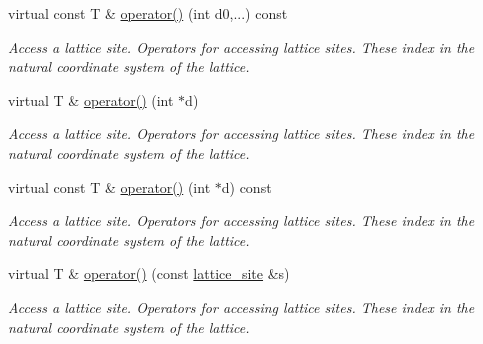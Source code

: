\begin{DoxyCompactItemize}
\mbox{\label{classsisl_1_1body__centered__cubic_af48bfe2b5475860672a421efc7fd0f41}} 
virtual const T \& \hyperlink{classsisl_1_1body__centered__cubic_af48bfe2b5475860672a421efc7fd0f41}{operator()} (int d0,...) const
\begin{DoxyCompactList}\small\item\em Access a lattice site. Operators for accessing lattice sites. These index in the natural coordinate system of the lattice. \end{DoxyCompactList}\item 
\mbox{\label{classsisl_1_1body__centered__cubic_a2390a32744243127b2be774fd99871f3}} 
virtual T \& \hyperlink{classsisl_1_1body__centered__cubic_a2390a32744243127b2be774fd99871f3}{operator()} (int $\ast$d)
\begin{DoxyCompactList}\small\item\em Access a lattice site. Operators for accessing lattice sites. These index in the natural coordinate system of the lattice. \end{DoxyCompactList}\item 
\mbox{\label{classsisl_1_1body__centered__cubic_a7cbc3858d97fe98a25a0570323169aa4}} 
virtual const T \& \hyperlink{classsisl_1_1body__centered__cubic_a7cbc3858d97fe98a25a0570323169aa4}{operator()} (int $\ast$d) const
\begin{DoxyCompactList}\small\item\em Access a lattice site. Operators for accessing lattice sites. These index in the natural coordinate system of the lattice. \end{DoxyCompactList}\item 
\mbox{\label{classsisl_1_1body__centered__cubic_aa8aae2c66e2cf075a419bb8232fbd43b}} 
virtual T \& \hyperlink{classsisl_1_1body__centered__cubic_aa8aae2c66e2cf075a419bb8232fbd43b}{operator()} (const \hyperlink{namespacesisl_acd18feee4026583db6185df2b25434aa}{lattice\+\_\+site} \&s)
\begin{DoxyCompactList}\small\item\em Access a lattice site. Operators for accessing lattice sites. These index in the natural coordinate system of the lattice. \end{DoxyCompactList}\item 

\end{DoxyCompactItemize}
